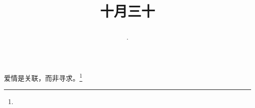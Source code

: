 \title{\date[d=30,m=11,y=2024][year:cn-y,年,month:cn,day:cn,日,·,weekday]·十月三十 }
爱情是关联，而非寻求。\footnote{ }

